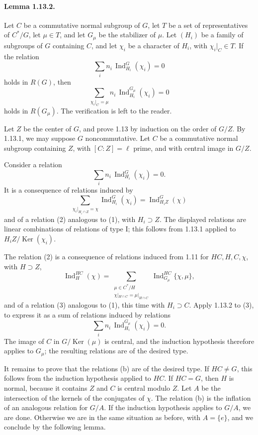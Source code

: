 \documentclass[10pt]{article}
\newcommand{\Ind}{\operatorname{Ind}}
\providecommand{\Ker}{\operatorname{Ker}}
\begin{document}
\paragraph{Lemma 1.13.2.} Let \(C\) be a commutative normal subgroup of \(G\), let \(T\) be a set of representatives of \(C^*/G\), let \(\mu\in T\), and let \(G_\mu\) be the stabilizer of \(\mu\). Let \((H_i)\) be a family of subgroups of \(G\) containing \(C\), and let \(\chi_i\) be a character of \(H_i\), with \(\chi_i|_C\in T\). If the relation
\[
\sum_i n_i\,\Ind_{H_i}^G(\chi_i)=0
\]
holds in \(R(G)\), then
\[
\sum_{\chi_i|_C=\mu}
n_i\,\Ind_{H_i}^{G_\mu}(\chi_i)=0
\]
holds in \(R(G_\mu)\). The verification is left to the reader.

Let \(Z\) be the center of \(G\), and prove 1.13 by induction on the order of \(G/Z\). By 1.13.1, we may suppose \(G\) noncommutative. Let \(C\) be a commutative normal subgroup containing \(Z\), with \([C:Z]=\ell\) prime, and with central image in \(G/Z\).

Consider a relation
\[
\tag{1}
\sum_i n_i\,\Ind_{H_i}^G(\chi_i)=0.
\]
It is a consequence of relations induced by
\[
\sum_{\chi_i|_{H_i\cap Z}=\chi}\Ind_{H_i}^G(\chi_i)=\Ind_{H_iZ}^G(\chi)
\]
and of a relation (2) analogous to (1), with \(H_i\supset Z\). The displayed relations are linear combinations of relations of type I; this follows from 1.13.1 applied to \(H_iZ/\Ker(\chi_i)\).

The relation (2) is a consequence of relations induced from 1.11 for \(HC,H,C,\chi\), with \(H\supset Z\),
\[
\tag{b}
\Ind_H^{HC}(\chi)=
\sum_{\substack{\mu\in C^*/H\\ \chi|_{H\cap C}=\mu|_{H\cap C}}}
\Ind_{G_\mu}^{HC}\{\chi,\mu\},
\]
and of a relation (3) analogous to (1), this time with \(H_i\supset C\). Apply 1.13.2 to (3), to express it as a sum of relations induced by relations
\[
\sum_i n_i\,\Ind_{H_i}^{G_\mu}(\chi_i)=0.
\]
The image of \(C\) in \(G/\Ker(\mu)\) is central, and the induction hypothesis therefore applies to \(G_\mu\); the resulting relations are of the desired type.

It remains to prove that the relations (b) are of the desired type. If \(HC\ne G\), this follows from the induction hypothesis applied to \(HC\). If \(HC=G\), then \(H\) is normal, because it contains \(Z\) and \(C\) is central modulo \(Z\). Let \(A\) be the intersection of the kernels of the conjugates of \(\chi\). The relation (b) is the inflation of an analogous relation for \(G/A\). If the induction hypothesis applies to \(G/A\), we are done. Otherwise we are in the same situation as before, with \(A=\{e\}\), and we conclude by the following lemma.
\end{document}
